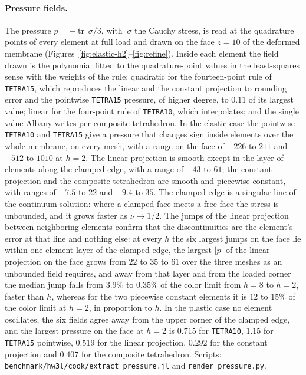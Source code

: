 \documentclass[11pt]{article}
\newcommand{\trace}{\operatorname{tr}}
\newcommand{\code}[1]{\texttt{#1}}
\theoremstyle{definition}
\theoremstyle{plain}
\begin{document}
\paragraph{Pressure fields.} The pressure $p = -\trace~\sigma/3$, with
$~\sigma$ the Cauchy stress, is read at the quadrature points of every
element at full load and drawn on the face $z = 10$ of the deformed
membrane (Figures~\ref{fig:elastic-h2}--\ref{fig:refine}). Inside each
element the field drawn is the polynomial fitted to the quadrature-point
values in the least-squares sense with the weights of the rule: quadratic
for the fourteen-point rule of \code{TETRA15}, which reproduces the linear
and the constant projection to rounding error and the pointwise
\code{TETRA15} pressure, of higher degree, to $0.11$ of its largest value;
linear for the four-point rule of \code{TETRA10}, which interpolates; and
the single value Albany writes per composite tetrahedron. In the elastic
case the pointwise \code{TETRA10} and \code{TETRA15} give a pressure that
changes sign inside elements over the whole membrane, on every mesh, with
a range on the face of $-226$ to $211$ and $-512$ to $1010$ at $h = 2$.
The linear projection is smooth except in the layer of elements along the
clamped edge, with a range of $-43$ to $61$; the constant projection and
the composite tetrahedron are smooth and piecewise constant, with ranges of
$-7.5$ to $22$ and $-9.4$ to $35$. The clamped edge is a singular line of
the continuum solution: where a clamped face meets a free face the stress is
unbounded, and it grows faster as $\nu \to 1/2$. The jumps of the linear
projection between neighboring elements confirm that the discontinuities
are the element's error at that line and nothing else: at every $h$ the
six largest jumps on the face lie within one element layer of the clamped
edge, the largest $\lvert p \rvert$ of the linear projection on the face
grows from $22$ to $35$ to $61$ over the three meshes as an unbounded field
requires, and away from that layer and from the loaded corner the median
jump falls from $3.9\%$ to $0.35\%$ of the color limit from $h = 8$ to
$h = 2$, faster than $h$, whereas for the two piecewise constant elements
it is $12$ to $15\%$ of the color limit at $h = 2$, in proportion to $h$.
In the plastic case no element oscillates, the six fields agree away from
the upper corner of the clamped edge, and the largest pressure on the face
at $h = 2$ is $0.715$ for \code{TETRA10}, $1.15$ for \code{TETRA15}
pointwise, $0.519$ for the linear projection, $0.292$ for the constant
projection and $0.407$ for the composite tetrahedron. Scripts:
\code{benchmark/hw3l/cook/extract\_pressure.jl} and
\code{render\_pressure.py}.
\end{document}
